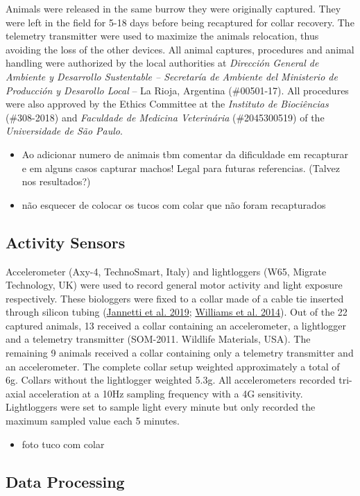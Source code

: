 \documentclass[english,msc,numbers,hidelinks]{coppe}
\providecommand{\tightlist}{%
  \setlength{\itemsep}{0pt}\setlength{\parskip}{0pt}}
\begin{document}
  Animals were released in the same burrow they were originally captured. They were left in the field for 5-18 days before being recaptured for collar recovery. The telemetry transmitter were used to maximize the animals relocation, thus avoiding the loss of the other devices. All animal captures, procedures and animal handling were authorized by the local authorities at \emph{Dirección General de Ambiente y Desarrollo Sustentable -- Secretaría de Ambiente del Ministerio de Producción y Desarollo Local} -- La Rioja, Argentina (\#00501-17). All procedures were also approved by the Ethics Committee at the \emph{Instituto de Biociências} (\#308-2018) and \emph{Faculdade de Medicina Veterinária} (\#2045300519) of the \emph{Universidade de São Paulo}.
  \begin{itemize}
  \tightlist
  \item
    Ao adicionar numero de animais tbm comentar da dificuldade em recapturar e em alguns casos capturar machos! Legal para futuras referencias. (Talvez nos resultados?)
  \item
    não esquecer de colocar os tucos com colar que não foram recapturados
  \end{itemize}
  \hypertarget{activity-sensors}{%
  \subsection{Activity Sensors}\label{activity-sensors}}

  Accelerometer (Axy-4, TechnoSmart, Italy) and lightloggers (W65, Migrate Technology, UK) were used to record general motor activity and light exposure respectively. These biologgers were fixed to a collar made of a cable tie inserted through silicon tubing (\protect\hyperlink{ref-jannetti2019}{Jannetti et al. 2019}; \protect\hyperlink{ref-williams2014}{Williams et al. 2014}). Out of the 22 captured animals, 13 received a collar containing an accelerometer, a lightlogger and a telemetry transmitter (SOM-2011. Wildlife Materials, USA). The remaining 9 animals received a collar containing only a telemetry transmitter and an accelerometer. The complete collar setup weighted approximately a total of 6g. Collars without the lightlogger weighted 5.3g. All accelerometers recorded tri-axial acceleration at a 10Hz sampling frequency with a 4G sensitivity. Lightloggers were set to sample light every minute but only recorded the maximum sampled value each 5 minutes.
  \begin{itemize}
  \tightlist
  \item
    foto tuco com colar
  \end{itemize}
  \hypertarget{data-processing}{%
  \subsection{Data Processing}\label{data-processing}}
\end{document}
